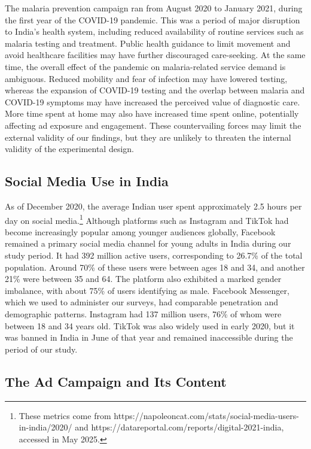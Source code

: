 The malaria prevention campaign ran from August 2020 to January 2021, during the first year of the COVID-19 pandemic. This was a period of major disruption to India’s health system, including reduced availability of routine services such as malaria testing and treatment. Public health guidance to limit movement and avoid healthcare facilities may have further discouraged care-seeking. At the same time, the overall effect of the pandemic on malaria-related service demand is ambiguous. Reduced mobility and fear of infection may have lowered testing, whereas the expansion of COVID-19 testing and the overlap between malaria and COVID-19 symptoms may have increased the perceived value of diagnostic care. More time spent at home may also have increased time spent online, potentially affecting ad exposure and engagement. These countervailing forces may limit the external validity of our findings, but they are unlikely to threaten the internal validity of the experimental design.




\subsection{Social Media Use in India} \label{sec_intervention}

As of December 2020, the average Indian user spent approximately 2.5 hours per day on social media.\footnote{These metrics come from https://napoleoncat.com/stats/social-media-users-in-india/2020/ and https://datareportal.com/reports/digital-2021-india, accessed in May 2025.} Although platforms such as Instagram and TikTok had become increasingly popular among younger audiences globally, Facebook remained a primary social media channel for young adults in India during our study period. It had 392 million active users, corresponding to 26.7\% of the total population. Around 70\% of these users were between ages 18 and 34, and another 21\% were between 35 and 64. The platform also exhibited a marked gender imbalance, with about 75\% of users identifying as male. Facebook Messenger, which we used to administer our surveys, had comparable penetration and demographic patterns. Instagram had 137 million users, 76\% of whom were between 18 and 34 years old. TikTok was also widely used in early 2020, but it was banned in India in June of that year and remained inaccessible during the period of our study.


\subsection{The Ad Campaign and Its Content} 

